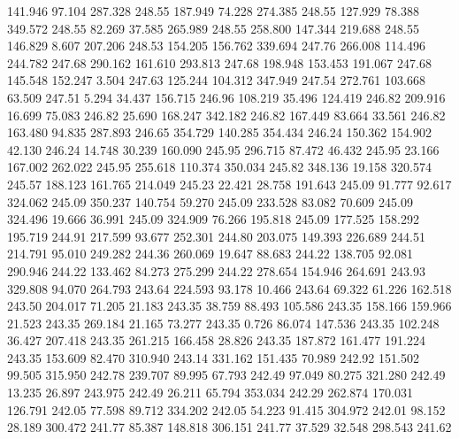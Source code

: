  141.946   97.104  287.328       248.55
 187.949   74.228  274.385       248.55
 127.929   78.388  349.572       248.55
  82.269   37.585  265.989       248.55
 258.800  147.344  219.688       248.55
 146.829    8.607  207.206       248.53
 154.205  156.762  339.694       247.76
 266.008  114.496  244.782       247.68
 290.162  161.610  293.813       247.68
 198.948  153.453  191.067       247.68
 145.548  152.247    3.504       247.63
 125.244  104.312  347.949       247.54
 272.761  103.668   63.509       247.51
   5.294   34.437  156.715       246.96
 108.219   35.496  124.419       246.82
 209.916   16.699   75.083       246.82
  25.690  168.247  342.182       246.82
 167.449   83.664   33.561       246.82
 163.480   94.835  287.893       246.65
 354.729  140.285  354.434       246.24
 150.362  154.902   42.130       246.24
  14.748   30.239  160.090       245.95
 296.715   87.472   46.432       245.95
  23.166  167.002  262.022       245.95
 255.618  110.374  350.034       245.82
 348.136   19.158  320.574       245.57
 188.123  161.765  214.049       245.23
  22.421   28.758  191.643       245.09
  91.777   92.617  324.062       245.09
 350.237  140.754   59.270       245.09
 233.528   83.082   70.609       245.09
 324.496   19.666   36.991       245.09
 324.909   76.266  195.818       245.09
 177.525  158.292  195.719       244.91
 217.599   93.677  252.301       244.80
 203.075  149.393  226.689       244.51
 214.791   95.010  249.282       244.36
 260.069   19.647   88.683       244.22
 138.705   92.081  290.946       244.22
 133.462   84.273  275.299       244.22
 278.654  154.946  264.691       243.93
 329.808   94.070  264.793       243.64
 224.593   93.178   10.466       243.64
  69.322   61.226  162.518       243.50
 204.017   71.205   21.183       243.35
  38.759   88.493  105.586       243.35
 158.166  159.966   21.523       243.35
 269.184   21.165   73.277       243.35
   0.726   86.074  147.536       243.35
 102.248   36.427  207.418       243.35
 261.215  166.458   28.826       243.35
 187.872  161.477  191.224       243.35
 153.609   82.470  310.940       243.14
 331.162  151.435   70.989       242.92
 151.502   99.505  315.950       242.78
 239.707   89.995   67.793       242.49
  97.049   80.275  321.280       242.49
  13.235   26.897  243.975       242.49
  26.211   65.794  353.034       242.29
 262.874  170.031  126.791       242.05
  77.598   89.712  334.202       242.05
  54.223   91.415  304.972       242.01
  98.152   28.189  300.472       241.77
  85.387  148.818  306.151       241.77
  37.529   32.548  298.543       241.62
